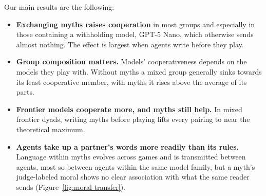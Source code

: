 Our main results are the following:
\begin{itemize}
\item \textbf{Exchanging myths raises cooperation} in most groups and especially in those containing a withholding model, GPT-5 Nano, which otherwise sends almost nothing. The effect is largest when agents write before they play.
\item \textbf{Group composition matters.} Models' cooperativeness depends on the models they play with. Without myths a mixed group generally sinks towards its least cooperative member, with myths it rises above the average of its parts.
\item \textbf{Frontier models cooperate more, and myths still help.} In mixed frontier dyads, writing myths before playing lifts every pairing to near the theoretical maximum.
\item \textbf{Agents take up a partner's words more readily than its rules.}  
Language within myths evolves across games and is transmitted between agents, most so between agents within the same model family,
but a myth's judge-labeled moral shows no clear association with what the same reader sends (Figure~\ref{fig:moral-transfer}).
\end{itemize}